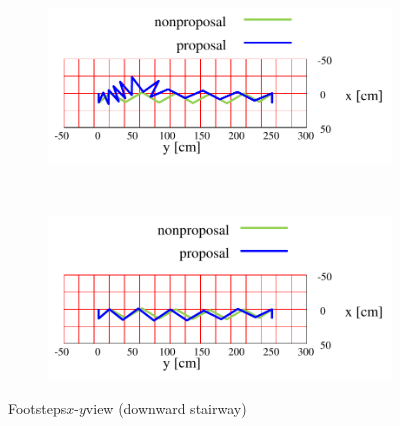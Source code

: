 \documentclass[autodetect-engine,dvipdfmx-if-dvi,ja=standard,a4j,jbase=11pt,magstyle=nomag*]{bxjsreport}
\begin{document}
\begin{figure}[pt]%
    \centering%
    \begin{subfigure}[c]{\linewidth}
        \centering%
        \includegraphics[width=0.9\linewidth, clip]{./figure/sim_hrp2_stair_downbad_xy.pdf}%
        \label{fig:sim_hrp2_stair_downbad_xy}%
    \end{subfigure}\\ %
    \vspace{10truemm}%
    \begin{subfigure}[c]{\linewidth}
        \centering%
        \includegraphics[width=0.9\linewidth, clip]{./figure/sim_hrp2_stair_down_xy.pdf}%
        \label{fig:sim_hrp2_stair_downgood_xy}%
    \end{subfigure}%
    \caption{Footsteps$x$-$y$view (downward stairway)}%
    \label{fig:sim_hrp2_stair_down_xy}%
\end{figure}
\end{document}
